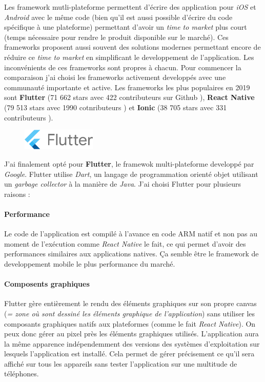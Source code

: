 Les framework mutli-plateforme permettent d'écrire des application pour \textit{iOS} et \textit{Android} avec le même code (bien qu'il est aussi possible d'écrire du code spécifique à une plateforme) permettant d'avoir un \textit{time to market} plus court (temps nécessaire pour rendre le produit disponible sur le marché). Ces frameworks proposent aussi souvent des solutions modernes permettant encore de réduire ce \textit{time to market} en simplificant le developpement de l'application. Les inconvénients de ces frameworks sont propres à chacun. Pour commencer la comparaison j'ai choisi les frameworks activement developpés avec une communauté importante et active. Les frameworks les plus populaires en 2019 sont \textbf{Flutter} (71 662 stars avec 422 contributeurs sur Github \cite{flutter}), \textbf{React Native} (79 513 stars avec 1990 cotnributeurs \cite{react}) et \textbf{Ionic} (38 705 stars avec 331 contributeurs \cite{ionic}).

\begin{figure}
  \includegraphics[width=100pt]{content/imgs/flutter.png}
\end{figure}

J'ai finalement opté pour \textbf{Flutter}, le framewok multi-plateforme developpé par \textit{Google}. Flutter utilise \textit{Dart}, un langage de programmation orienté objet utilisant un \textit{garbage collector} à la manière de \textit{Java}. J'ai choisi Flutter pour plusieurs raisons :

\paragraph{Performance}
Le code de l'application est compilé à l'avance en code ARM natif et non pas au moment de l'exécution comme \textit{React Native} le fait, ce qui permet d'avoir des performances similaires aux applications natives. Ça semble être le framework de developpement mobile le plus performance du marché.

\paragraph{Composents graphiques}
Flutter gère entièrement le rendu des éléments graphiques sur son propre canvas (\textit{= zone où sont dessiné les éléments graphique de l'application}) sans utiliser les composants graphiques natifs aux plateformes (comme le fait \textit{React Native}). On peux donc gérer au pixel près les éléments graphiques utilisés. L'application aura la même apparence indépendemment des versions des systèmes d'exploitation sur lesquels l'application est installé. Cela permet de gérer précisement ce qu'il sera affiché sur tous les appareils sans tester l'application sur une multitude de téléphones.


